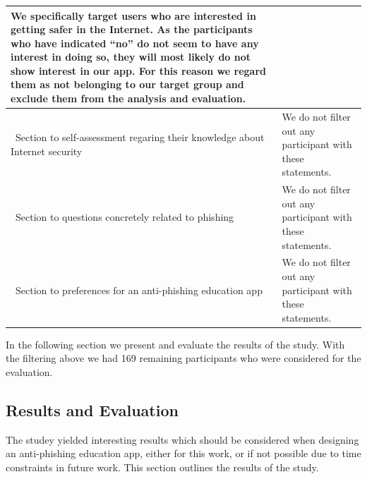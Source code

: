 \begin{center}
\begin{tabular}{ | p{5cm} | p{10cm} |}
 We specifically target users who are interested in getting safer in the Internet.
 As the participants who have indicated ``no'' do not seem to have any interest in doing so, they will most likely do not show interest in our app.
 For this reason we regard them as not belonging to our target group and exclude them from the analysis and evaluation.
\\
    \hline\  Section to self-assessment regaring their knowledge about Internet security &  We do not filter out any participant with these statements.
\\
		\hline\  Section to questions concretely related to phishing & We do not filter out any participant with these statements.
 \\
    \hline\  Section to preferences for an anti-phishing education app & We do not filter out any participant with these statements.
\\
    \hline
    \end{tabular}
		
\end{center}

In the following section we present and evaluate the results of the study.
 With the filtering above we had 169 remaining participants who were considered for the evaluation.

\subsection{Results and Evaluation}
The studey yielded interesting results which should be considered when designing an anti-phishing education app, either for this work, or if not possible due to time constraints in future work.
 This section outlines the results of the study.


